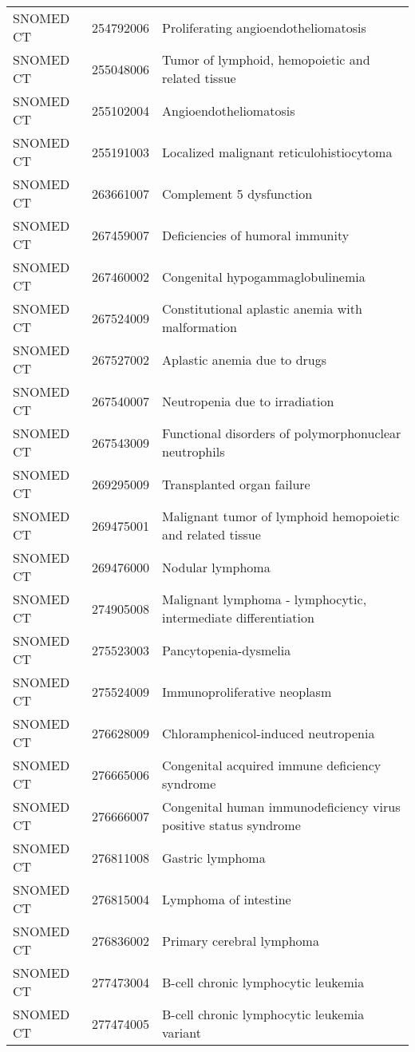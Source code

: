 \begin{table}[ht]
\begin{tabular}{lll}
  SNOMED CT & 254792006 & Proliferating angioendotheliomatosis \\ 
  SNOMED CT & 255048006 & Tumor of lymphoid, hemopoietic and related tissue \\ 
  SNOMED CT & 255102004 & Angioendotheliomatosis \\ 
  SNOMED CT & 255191003 & Localized malignant reticulohistiocytoma \\ 
  SNOMED CT & 263661007 & Complement 5 dysfunction \\ 
  SNOMED CT & 267459007 & Deficiencies of humoral immunity \\ 
  SNOMED CT & 267460002 & Congenital hypogammaglobulinemia \\ 
  SNOMED CT & 267524009 & Constitutional aplastic anemia with malformation \\ 
  SNOMED CT & 267527002 & Aplastic anemia due to drugs \\ 
  SNOMED CT & 267540007 & Neutropenia due to irradiation \\ 
  SNOMED CT & 267543009 & Functional disorders of polymorphonuclear neutrophils \\ 
  SNOMED CT & 269295009 & Transplanted organ failure \\ 
  SNOMED CT & 269475001 & Malignant tumor of lymphoid hemopoietic and related tissue \\ 
  SNOMED CT & 269476000 & Nodular lymphoma \\ 
  SNOMED CT & 274905008 & Malignant lymphoma - lymphocytic, intermediate differentiation \\ 
  SNOMED CT & 275523003 & Pancytopenia-dysmelia \\ 
  SNOMED CT & 275524009 & Immunoproliferative neoplasm \\ 
  SNOMED CT & 276628009 & Chloramphenicol-induced neutropenia \\ 
  SNOMED CT & 276665006 & Congenital acquired immune deficiency syndrome \\ 
  SNOMED CT & 276666007 & Congenital human immunodeficiency virus positive status syndrome \\ 
  SNOMED CT & 276811008 & Gastric lymphoma \\ 
  SNOMED CT & 276815004 & Lymphoma of intestine \\ 
  SNOMED CT & 276836002 & Primary cerebral lymphoma \\ 
  SNOMED CT & 277473004 & B-cell chronic lymphocytic leukemia \\ 
  SNOMED CT & 277474005 & B-cell chronic lymphocytic leukemia variant \\ 

\end{tabular}
\end{table}

